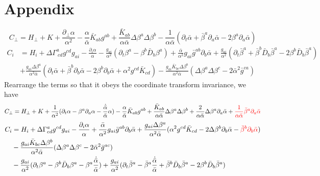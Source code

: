 \documentclass{article}
\begin{document}
\section{Appendix}
\[
C_{\perp} = H_{\perp} + K + \frac{\partial_{\perp}\alpha}{\alpha^2} - \frac{\alpha}{{\bar \alpha}}{\bar K}_{ab}g^{ab} + \frac{{\bar K}_{ab}}{\alpha {\bar \alpha}}\Delta \beta^{a} \Delta \beta^{b} - \frac{1}{\alpha {\bar \alpha}}(\partial_{t}{\bar \alpha} + {\bar \beta}^{a}\partial_{a}{\bar \alpha} - 2\beta^{a}\partial_{a}{\bar \alpha})
\]
\begin{align*}
C_{i} & = H_{i} + \Delta\Gamma^{a}_{~cd}g^{cd}g_{ai} - \frac{\partial_{i}\alpha}{\alpha} - \frac{g_{ai}}{\alpha^2}(\partial_{t}\beta^{a} - \beta^{b}{\bar D}_{b}\beta^{a}) + \frac{{\bar \alpha}}{\alpha^2}g_{ai}{\bar g}^{ab}\partial_{b}{\bar \alpha} + \frac{g_{ai}}{\alpha^2}(\partial_t {\bar \beta}^{a} + {\bar \beta}^{b}{\bar D}_{b}{\bar \beta}^{a} - 2\beta^{b}{\bar D}_{b}{\bar \beta}^{a})\\
& + \frac{g_{ai}\Delta \beta^{a}}{\alpha^2 {\bar \alpha}}(\partial_{t}{\bar \alpha} + {\bar \beta}^{b}\partial_{b}{\bar \alpha} - 2\beta^{b}\partial_{b}{\bar \alpha} + \alpha^2g^{cd}{\bar K}_{cd}) - \frac{g_{ai}{\bar K}_{bc}\Delta \beta^{b}}{\alpha^2 {\bar \alpha}}(\Delta \beta^{a}\Delta \beta^{c} - 2{\bar \alpha}^2{\bar g}^{ca})
\end{align*}
Rearrange the terms so that it obeys the coordinate transform invariance, we have
\[
C_{\perp} = H_{\perp} + K + \frac{1}{\alpha^2}(\partial_{t}\alpha - \beta^{a}\partial_{a}\alpha - \frac{{\dot{\bar\alpha}}}{{\bar \alpha}}\alpha) - \frac{\alpha}{{\bar \alpha}}{\bar K}_{ab}g^{ab} + \frac{{\bar K}_{ab}}{\alpha{\bar \alpha}}\Delta \beta^{a} \Delta \beta^{b} + \frac{2}{\alpha {\bar \alpha}}\Delta \beta^{a} \partial_{a}{\bar \alpha} + {\color{red}\frac{1}{\alpha{\bar \alpha}}{\bar \beta}^{a}\partial_{a}{\bar \alpha}}
\]
\begin{align*}
C_{i} & = H_{i} + \Delta \Gamma^{a}_{cd}g^{cd}g_{ai} - \frac{\partial_{i}\alpha}{\alpha} + \frac{{\bar \alpha}}{\alpha^2}g_{ai}{\bar g}^{ab}\partial_{b}{\bar \alpha} + \frac{g_{ai}\Delta \beta^{a}}{\alpha^2 {\bar \alpha}}(\alpha^2g^{cd}{\bar K}_{cd} - 2\Delta\beta^{b}\partial_{b}{\bar \alpha} - {\color{red}{\bar \beta}^{b}\partial_{b}{\bar \alpha}})\\
& - \frac{g_{ai}{\bar K}_{bc}\Delta \beta^{b}}{\alpha^2{\bar \alpha}}(\Delta \beta^{a}\Delta \beta^{c} - 2{\bar \alpha}^2{\bar g}^{ac})\\
& - \frac{g_{ai}}{\alpha^2}(\partial_{t}\beta^{a} - \beta^{b}{\bar D}_{b}\beta^{a} - \beta^{a}\frac{{\dot{\bar \alpha} }}{{\bar \alpha}}) + \frac{g_{ai}}{\alpha^2}(\partial_{t}{\bar \beta}^{a} - {\bar \beta}^{a}\frac{{\dot {\bar \alpha}}}{{\bar \alpha}} + {\bar \beta}^{b}{\bar D}_{b}{\bar \beta}^{a} - 2\beta^{b}{\bar D}_{b}{\bar \beta}^{a})
\end{align*}
\end{document}
